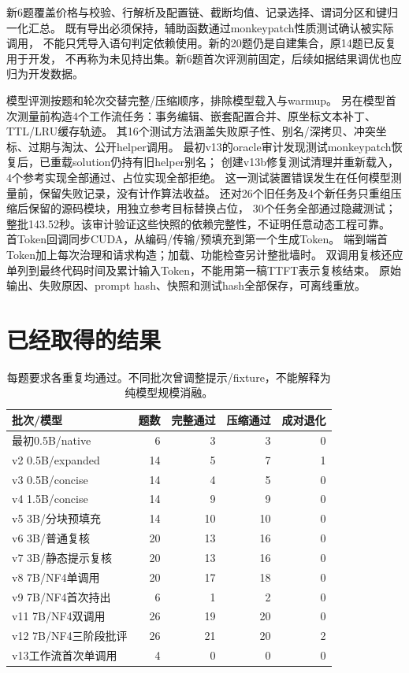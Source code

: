 \documentclass[UTF8,a4paper,11pt,fontset=fandol]{ctexart}
\begin{document}
新6题覆盖价格与校验、行解析及配置链、截断均值、记录选择、谓词分区和键归一化汇总。
既有导出必须保持，辅助函数通过monkeypatch性质测试确认被实际调用，
不能只凭导入语句判定依赖使用。新的20题仍是自建集合，原14题已反复用于开发，
不再称为未见持出集。新6题首次评测前固定，后续如据结果调优也应归为开发数据。

模型评测按题和轮次交替完整/压缩顺序，排除模型载入与warmup。
另在模型首次测量前构造4个工作流任务：事务编辑、嵌套配置合并、原坐标文本补丁、TTL/LRU缓存轨迹。
其16个测试方法涵盖失败原子性、别名/深拷贝、冲突坐标、过期与淘汰、公开helper调用。
最初v13的oracle审计发现测试monkeypatch恢复后，已重载solution仍持有旧helper别名；
创建v13b修复测试清理并重新载入，4个参考实现全部通过、占位实现全部拒绝。
这一测试装置错误发生在任何模型测量前，保留失败记录，没有计作算法收益。
还对26个旧任务及4个新任务只重组压缩后保留的源码模块，用独立参考目标替换占位，
30个任务全部通过隐藏测试；整批143.52秒。该审计验证这些快照的依赖完整性，不证明任意动态工程可靠。
首Token回调同步CUDA，从编码/传输/预填充到第一个生成Token。
端到端首Token加上每次治理和请求构造；加载、功能检查另计整批墙时。
双调用复核还应单列到最终代码时间及累计输入Token，不能用第一稿TTFT表示复核结束。
原始输出、失败原因、prompt hash、快照和测试hash全部保存，可离线重放。

\section{已经取得的结果}
\begin{table}[ht]
\centering\small
\begin{tabular}{lrrrr}
\toprule
批次/模型 & 题数 & 完整通过 & 压缩通过 & 成对退化\\
\midrule
最初0.5B/native & 6 & 3 & 3 & 0\\
v2 0.5B/expanded & 14 & 5 & 7 & 1\\
v3 0.5B/concise & 14 & 4 & 5 & 0\\
v4 1.5B/concise & 14 & 9 & 9 & 0\\
v5 3B/分块预填充 & 14 & 10 & 10 & 0\\
v6 3B/普通复核 & 20 & 13 & 16 & 0\\
v7 3B/静态提示复核 & 20 & 13 & 16 & 0\\
v8 7B/NF4单调用 & 20 & 17 & 18 & 0\\
v9 7B/NF4首次持出 & 6 & 1 & 2 & 0\\
v11 7B/NF4双调用 & 26 & 19 & 20 & 0\\
v12 7B/NF4三阶段批评 & 26 & 21 & 20 & 2\\
v13工作流首次单调用 & 4 & 0 & 0 & 0\\
\bottomrule
\end{tabular}
\caption{每题要求各重复均通过。不同批次曾调整提示/fixture，不能解释为纯模型规模消融。}
\end{table}
\end{document}
